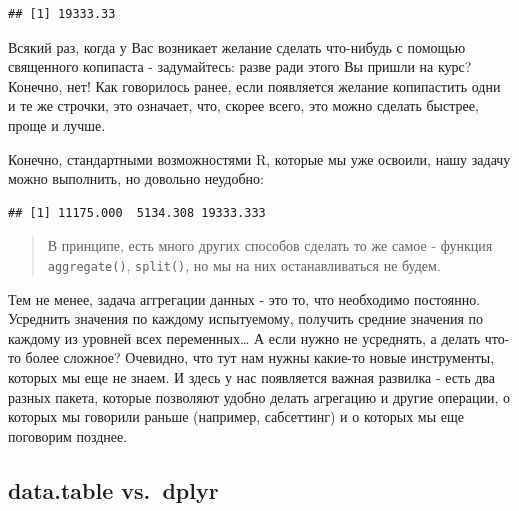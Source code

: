 \documentclass[]{book}
\newenvironment{Shaded}{\begin{snugshade}}{\end{snugshade}}
\newcommand{\KeywordTok}[1]{\textcolor[rgb]{0.13,0.29,0.53}{\textbf{#1}}}
\newcommand{\DataTypeTok}[1]{\textcolor[rgb]{0.13,0.29,0.53}{#1}}
\newcommand{\StringTok}[1]{\textcolor[rgb]{0.31,0.60,0.02}{#1}}
\newcommand{\ControlFlowTok}[1]{\textcolor[rgb]{0.13,0.29,0.53}{\textbf{#1}}}
\newcommand{\OperatorTok}[1]{\textcolor[rgb]{0.81,0.36,0.00}{\textbf{#1}}}
\newcommand{\NormalTok}[1]{#1}
\begin{document}
\begin{verbatim}
## [1] 19333.33
\end{verbatim}

Всякий раз, когда у Вас возникает желание сделать что-нибудь с помощью
священного копипаста - задумайтесь: разве ради этого Вы пришли на курс?
Конечно, нет! Как говорилось ранее, если появляется желание копипастить
одни и те же строчки, это означает, что, скорее всего, это можно сделать
быстрее, проще и лучше.

Конечно, стандартными возможностями R, которые мы уже освоили, нашу
задачу можно выполнить, но довольно неудобно:

\begin{Shaded}
\end{Shaded}

\begin{verbatim}
## [1] 11175.000  5134.308 19333.333
\end{verbatim}

\begin{quote}
В принципе, есть много других способов сделать то же самое - функция
\texttt{aggregate()}, \texttt{split()}, но мы на них останавливаться не
будем.
\end{quote}

Тем не менее, задача аггрегации данных - это то, что необходимо
постоянно. Усреднить значения по каждому испытуемому, получить средние
значения по каждому из уровней всех переменных\ldots{} А если нужно не
усреднять, а делать что-то более сложное? Очевидно, что тут нам нужны
какие-то новые инструменты, которых мы еще не знаем. И здесь у нас
появляется важная развилка - есть два разных пакета, которые позволяют
удобно делать агрегацию и другие операции, о которых мы говорили раньше
(например, сабсеттинг) и о которых мы еще поговорим позднее.

\subsection{data.table vs.~dplyr}\label{holywar}
\end{document}
